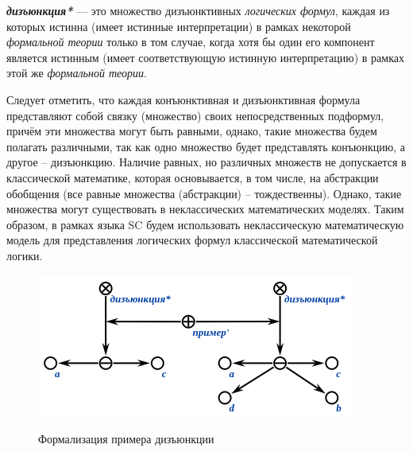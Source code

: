 
\begin{SCn}
\end{SCn}

\textbf{\textit{дизъюнкция*}} --- это множество дизъюнктивных \textit{логических формул}, каждая из которых истинна (имеет истинные интерпретации) в рамках некоторой \textit{формальной теории} только в том случае, когда хотя бы один его компонент является истинным (имеет соответствующую истинную интерпретацию) в рамках этой же \textit{формальной теории}.

Следует отметить, что каждая конъюнктивная и дизъюнктивная формула представляют собой связку (множество) своих непосредственных подформул, причём эти множества могут быть равными, однако, такие множества будем полагать различными, так как одно множество будет представлять конъюнкцию, а другое -- дизъюнкцию. Наличие равных, но различных множеств не допускается в классической математике, которая основывается, в том числе, на абстракции обобщения (все равные множества (абстракции) -- тождественны). Однако, такие множества могут существовать в неклассических математических моделях. Таким образом, в рамках языка SC будем использовать неклассическую математическую модель для представления логических формул классической математической логики.

\begin{figure}[H]
	\caption{Формализация примера дизъюнкции}
	\includegraphics[scale=0.8]{author/part2/figures/logic/disjunction.png}
	\label{fig:disjunction}
\end{figure}

